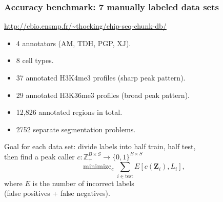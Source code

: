 \documentclass{beamer}
\DeclareMathOperator*{\minimize}{minimize}
\newcommand{\ZZ}{\mathbb Z}
\begin{document}
\begin{frame}
  \frametitle{Accuracy benchmark: 7 manually labeled data sets}
  \url{http://cbio.ensmp.fr/~thocking/chip-seq-chunk-db/}
  \begin{itemize}
  \item 4 annotators (AM, TDH, PGP, XJ).
  \item 8 cell types.
  \item 37 annotated H3K4me3 profiles (sharp peak pattern).
  \item 29 annotated H3K36me3 profiles (broad peak pattern).
  \item 12,826 annotated regions in total.
  \item 2752 separate segmentation problems.
  \end{itemize}
  Goal for each data set: divide labels into half train, half test,\\
  then find a peak caller $c:\ZZ_+^{B\times S} \rightarrow
  \{0,1\}^{B\times S}$
  \begin{equation*}
    \minimize_c \sum_{i\in\text{test}} E[c(\mathbf Z_i),  L_i],
  \end{equation*}
  where $E$ is the number of incorrect labels\\(false positives + false
  negatives).
\end{frame}
\end{document}

